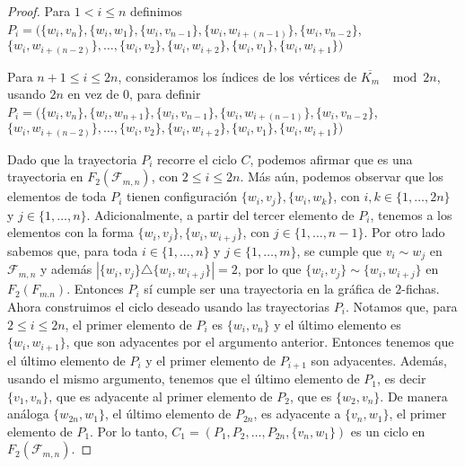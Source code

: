 \begin{proof}
    Para $1 < i \leq n$ definimos
    $P_i=(\{w_i,v_n\},\{w_i,w_1\},\{w_i,v_{n-1}\},\{w_i,w_{i+(n-1)}\},\{w_i,v_{n-2}\}$,
    $\{w_i,w_{i+(n-2)}\},\dots,\{w_i,v_2\},\{w_i,w_{i+2}\},\{w_i,v_1\},\{w_i,w_{i+1}\})$

    Para $n+1\leq i \leq 2n$, consideramos los \'indices de los v\'ertices de
    $\overline{K_m}$ $\mod 2n$, usando $2n$ en vez de $0$, para definir
    $P_i=(\{w_i,v_n\},\{w_i,w_{n+1}\},\{w_i,v_{n-1}\},\{w_i,w_{i+(n-1)}\},\{w_i,v_{n-2}\}$,
    $\{w_i,w_{i+(n-2)}\},\dots,
    \{w_i,v_2\},\{w_i,w_{i+2}\},\{w_i,v_1\},\{w_i,w_{i+1}\})$

    Dado que la trayectoria $P_i$ recorre el ciclo $C$, podemos afirmar que es
    una trayectoria en $F_2(\mathcal{F}_{m,n})$, con $2\leq i \leq 2n$. M\'as
    a\'un, podemos observar que los elementos de toda $P_i$ tienen
    configuraci\'on $\{w_i,v_j\},\{w_i,w_k\}$, con $i, k\in \{1, \dots, 2n\}$ y
    $j \in \{1, \dots, n\}$. Adicionalmente, a partir del tercer elemento de
    $P_i$, tenemos a los elementos con la forma $\{w_i,v_j\},\{w_i,w_{i+j}\}$,
    con $j \in \{1, \dots, n-1\}$.  Por otro lado sabemos que, para toda $i \in
    \{1, \dots, n\}$ y $j \in \{1, \dots, m\}$, se cumple que $v_i \sim w_j$ en
    $\mathcal{F}_{m,n}$ y adem\'as $|\{w_i,v_j\} \triangle \{w_i, w_{i+j}\}|=2$,
    por lo que $\{w_i,v_j\} \sim \{w_i, w_{i+j}\}$ en $F_2(F_{m.n})$. Entonces
    $P_i$ s\'i cumple ser una trayectoria en la gr\'afica de $2$-fichas. Ahora
    construimos el ciclo deseado usando las trayectorias $P_i$. Notamos que,
    para $2 \leq i \leq 2n$, el primer elemento de $P_i$ es $\{w_i, v_n\}$ y el
    \'ultimo elemento es $\{w_i, w_{i+1}\}$, que son adyacentes por el argumento
    anterior. Entonces tenemos que el \'ultimo elemento de $P_i$ y el primer
    elemento de $P_{i+1}$ son adyacentes. Adem\'as, usando el mismo argumento,
    tenemos que el \'ultimo elemento de $P_1$, es decir $\{v_1,v_n\}$, que es
    adyacente al primer elemento de $P_2$, que es $\{w_2,v_n\}$. De manera
    an\'aloga $\{w_{2n},w_1\}$, el \'ultimo elemento de $P_{2n}$, es adyacente a
    $\{v_n,w_1\}$, el primer elemento de $P_1$. Por lo tanto, $C_1 = (P_1,P_2,
    \dots, P_{2n},\{v_n,w_1\})$ es un ciclo en $F_2(\mathcal{F}_{m,n})$. 


\end{proof}
